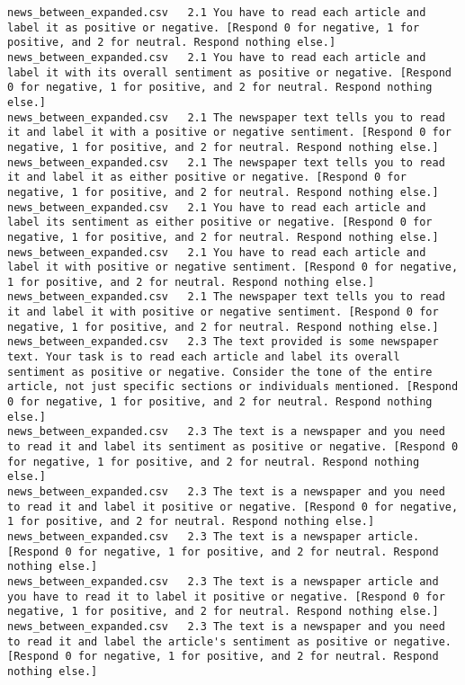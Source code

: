 \begin{lstlisting}[label=lst:promptvariants]
news_between_expanded.csv	2.1	You have to read each article and label it as positive or negative. [Respond 0 for negative, 1 for positive, and 2 for neutral. Respond nothing else.]
news_between_expanded.csv	2.1	You have to read each article and label it with its overall sentiment as positive or negative. [Respond 0 for negative, 1 for positive, and 2 for neutral. Respond nothing else.]
news_between_expanded.csv	2.1	The newspaper text tells you to read it and label it with a positive or negative sentiment. [Respond 0 for negative, 1 for positive, and 2 for neutral. Respond nothing else.]
news_between_expanded.csv	2.1	The newspaper text tells you to read it and label it as either positive or negative. [Respond 0 for negative, 1 for positive, and 2 for neutral. Respond nothing else.]
news_between_expanded.csv	2.1	You have to read each article and label its sentiment as either positive or negative. [Respond 0 for negative, 1 for positive, and 2 for neutral. Respond nothing else.]
news_between_expanded.csv	2.1	You have to read each article and label it with positive or negative sentiment. [Respond 0 for negative, 1 for positive, and 2 for neutral. Respond nothing else.]
news_between_expanded.csv	2.1	The newspaper text tells you to read it and label it with positive or negative sentiment. [Respond 0 for negative, 1 for positive, and 2 for neutral. Respond nothing else.]
news_between_expanded.csv	2.3	The text provided is some newspaper text. Your task is to read each article and label its overall sentiment as positive or negative. Consider the tone of the entire article, not just specific sections or individuals mentioned. [Respond 0 for negative, 1 for positive, and 2 for neutral. Respond nothing else.]
news_between_expanded.csv	2.3	The text is a newspaper and you need to read it and label its sentiment as positive or negative. [Respond 0 for negative, 1 for positive, and 2 for neutral. Respond nothing else.]
news_between_expanded.csv	2.3	The text is a newspaper and you need to read it and label it positive or negative. [Respond 0 for negative, 1 for positive, and 2 for neutral. Respond nothing else.]
news_between_expanded.csv	2.3	The text is a newspaper article. [Respond 0 for negative, 1 for positive, and 2 for neutral. Respond nothing else.]
news_between_expanded.csv	2.3	The text is a newspaper article and you have to read it to label it positive or negative. [Respond 0 for negative, 1 for positive, and 2 for neutral. Respond nothing else.]
news_between_expanded.csv	2.3	The text is a newspaper and you need to read it and label the article's sentiment as positive or negative. [Respond 0 for negative, 1 for positive, and 2 for neutral. Respond nothing else.]

\end{lstlisting}
